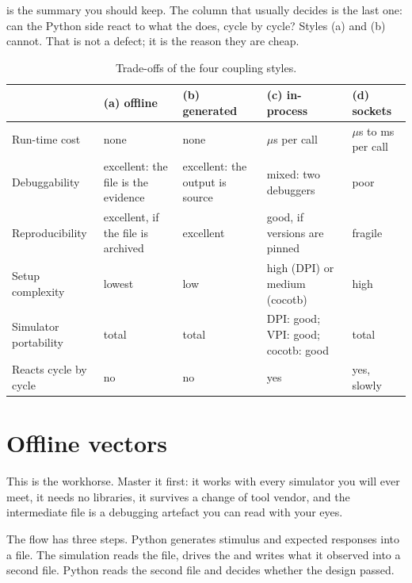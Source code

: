  is the summary you should keep. The column that
usually decides is the last one: can the Python side react to what the \DUT
does, cycle by cycle? Styles (a) and (b) cannot. That is not a defect; it is
the reason they are cheap.

\begin{table}[htbp]
\centering
\caption{Trade-offs of the four coupling styles.}
\label{tab:python:tradeoffs}
\small
\begin{tabularx}{\linewidth}{@{}lXXXX@{}}
\toprule
 & \textbf{(a) offline} & \textbf{(b) generated} & \textbf{(c) in-process}
 & \textbf{(d) sockets} \\
\midrule
Run-time cost      & none & none & \(\mu\)s per call & \(\mu\)s to ms per call \\
Debuggability      & excellent: the file is the evidence & excellent: the
                     output is source & mixed: two debuggers & poor \\
Reproducibility    & excellent, if the file is archived & excellent & good,
                     if versions are pinned & fragile \\
Setup complexity   & lowest & low & high (DPI) or medium (cocotb) & high \\
Simulator portability & total & total & DPI: good; VPI: good; cocotb: good
                     & total \\
Reacts cycle by cycle & no & no & yes & yes, slowly \\
\bottomrule
\end{tabularx}
\end{table}

\section{Offline vectors}
\label{sec:python:vectors}

This is the workhorse. Master it first: it works with every simulator you
will ever meet, it needs no libraries, it survives a change of tool vendor,
and the intermediate file is a debugging artefact you can read with your
eyes.

The flow has three steps. Python generates stimulus and expected responses
into a file. The simulation reads the file, drives the \DUT and writes what
it observed into a second file. Python reads the second file and decides
whether the design passed.

